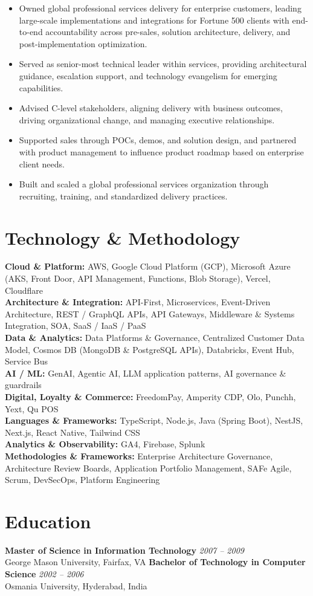 \documentclass[11pt]{article}
\begin{document}
\begin{itemize}
  \item Owned global professional services delivery for enterprise customers, leading large-scale implementations and integrations for Fortune 500 clients with end-to-end accountability across pre-sales, solution architecture, delivery, and post-implementation optimization.
  \item Served as senior-most technical leader within services, providing architectural guidance, escalation support, and technology evangelism for emerging capabilities.
  \item Advised C-level stakeholders, aligning delivery with business outcomes, driving organizational change, and managing executive relationships.
  \item Supported sales through POCs, demos, and solution design, and partnered with product management to influence product roadmap based on enterprise client needs.
  \item Built and scaled a global professional services organization through recruiting, training, and standardized delivery practices.
\end{itemize}

\section*{Technology \& Methodology}
\textbf{Cloud \& Platform:} AWS, Google Cloud Platform (GCP), Microsoft Azure (AKS, Front Door, API Management, Functions, Blob Storage), Vercel, Cloudflare \\
\textbf{Architecture \& Integration:} API-First, Microservices, Event-Driven Architecture, REST / GraphQL APIs, API Gateways, Middleware \& Systems Integration, SOA, SaaS / IaaS / PaaS \\
\textbf{Data \& Analytics:} Data Platforms \& Governance, Centralized Customer Data Model, Cosmos DB (MongoDB \& PostgreSQL APIs), Databricks, Event Hub, Service Bus \\
\textbf{AI / ML:} GenAI, Agentic AI, LLM application patterns, AI governance \& guardrails \\
\textbf{Digital, Loyalty \& Commerce:} FreedomPay, Amperity CDP, Olo, Punchh, Yext, Qu POS \\
\textbf{Languages \& Frameworks:} TypeScript, Node.js, Java (Spring Boot), NestJS, Next.js, React Native, Tailwind CSS \\
\textbf{Analytics \& Observability:} GA4, Firebase, Splunk \\
\textbf{Methodologies \& Frameworks:} Enterprise Architecture Governance, Architecture Review Boards, Application Portfolio Management, SAFe Agile, Scrum, DevSecOps, Platform Engineering

\section*{Education}
\textbf{Master of Science in Information Technology} \hfill \textit{2007 -- 2009} \\
George Mason University, Fairfax, VA
\newline
\textbf{Bachelor of Technology in Computer Science} \hfill \textit{2002 -- 2006} \\
Osmania University, Hyderabad, India
\end{document}
